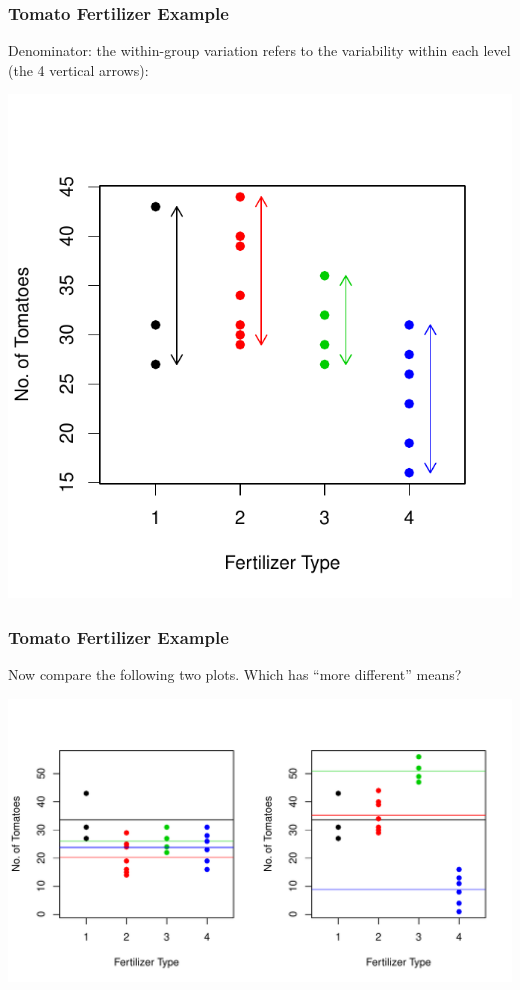 \documentclass[handout]{beamer}
\newcommand{\blue}[1]{\textcolor{blue2}{#1}}
\begin{document}
\begin{frame}
\frametitle{Tomato Fertilizer Example}
Denominator: the \blue{within-group variation} refers to the variability \blue{within} each level (the 4 vertical arrows):
\begin{center}
\includegraphics{figure/lec22-005}
\end{center}
\end{frame}


\begin{frame}
\frametitle{Tomato Fertilizer Example}
Now compare the following two plots.  Which has ``more different'' means?
\begin{center}
\includegraphics{figure/lec22-008}
\end{center}

\end{frame}
\end{document}
